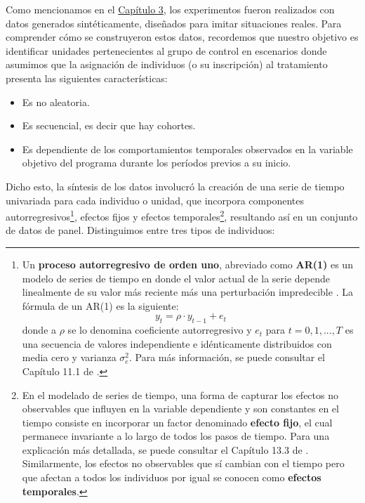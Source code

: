 \documentclass[../../main.tex]{subfiles}
\begin{document}
Como mencionamos en el \hyperref[chap:problema]{Capítulo 3}, los experimentos fueron
realizados con datos generados sintéticamente, diseñados para imitar situaciones reales.
Para comprender cómo se construyeron estos datos, recordemos que nuestro objetivo es
identificar unidades pertenecientes al grupo de control en escenarios donde asumimos que
la asignación de individuos (o su inscripción) al tratamiento presenta las siguientes
características:
\begin{itemize}[itemsep=0.05cm]
    \item Es no aleatoria.
    \item Es secuencial, es decir que hay cohortes.
    \item Es dependiente de los comportamientos temporales observados en la variable
    objetivo del programa durante los períodos previos a su inicio.
\end{itemize}

Dicho esto, la síntesis de los datos involucró la creación de una serie de tiempo
univariada para cada individuo o unidad, que incorpora componentes
autorregresivos\footnote{Un \textbf{proceso autorregresivo de orden uno}, abreviado como
\textbf{AR(1)} es un modelo de series de tiempo en donde el valor actual de la serie
depende linealmente de su valor más reciente más una perturbación impredecible
\cite{intro-econometria-wooldridge}. La fórmula de un AR(1) es la siguiente:
\[
    y_t = \rho \cdot y_{t-1} + e_t
\]
donde a \(\rho\) se lo denomina coeficiente autorregresivo y \(e_t\) para \(t=0,1,...,T\)
es una secuencia de valores independiente e idénticamente distribuidos con media cero y
varianza \(\sigma_e^2\). Para más información, se puede consultar el Capítulo 11.1 de
\cite{intro-econometria-wooldridge}.}, efectos fijos y efectos temporales\footnote{En el
modelado de series de tiempo, una forma de capturar los efectos no observables que
influyen en la variable dependiente y son constantes en el tiempo consiste en incorporar
un factor denominado \textbf{efecto fijo}, el cual permanece invariante a lo largo de
todos los pasos de tiempo. Para una explicación más detallada, se puede consultar el
Capítulo 13.3 de \cite{intro-econometria-wooldridge}. Similarmente, los efectos no
observables que sí cambian con el tiempo pero que afectan a todos los individuos por igual
se conocen como \textbf{efectos temporales}.}, resultando así en un conjunto de datos
de panel. Distinguimos entre tres tipos de individuos:
\end{document}
